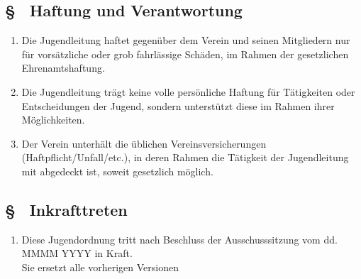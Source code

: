 \subsection{§ \thejoparagraphcounter\ Haftung und Verantwortung} \label{jo:par:haftung_verantwortung}
\begin{enumerate}
    \item \label{jo:abs:gh3w5l} Die Jugendleitung haftet gegenüber dem Verein und seinen Mitgliedern nur für vorsätzliche oder grob fahrlässige Schäden, im Rahmen der gesetzlichen Ehrenamtshaftung.

    \item \label{jo:abs:up1q4u} Die Jugendleitung trägt keine volle persönliche Haftung für Tätigkeiten oder Entscheidungen der Jugend, sondern unterstützt diese im Rahmen ihrer Möglichkeiten.

    \item \label{jo:abs:av3mbu} Der Verein unterhält die üblichen Vereinsversicherungen (Haftpflicht/Unfall/etc.), in deren Rahmen die Tätigkeit der Jugendleitung mit abgedeckt ist, soweit gesetzlich möglich.
\end{enumerate}

\subsection{§ \thejoparagraphcounter\ Inkrafttreten} \label{jo:par:inkrafttreten}
\begin{enumerate}
    \item \label{jo:abs:x95wtg} Diese Jugendordnung tritt nach Beschluss der Ausschusssitzung vom dd. MMMM YYYY in Kraft. \\
    Sie ersetzt alle vorherigen Versionen
\end{enumerate}